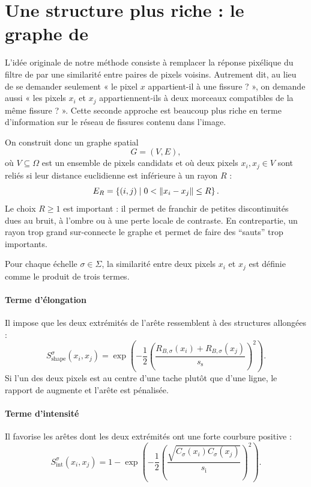\section{Une structure plus riche : le graphe de \Frangi}
\label{sec:chapIII_graphe_frangi}

L'idée originale de notre méthode consiste à remplacer la réponse pixélique du filtre de \Frangi{} par une similarité entre paires de pixels voisins. 
Autrement dit, au lieu de se demander seulement « le pixel $x$ appartient-il à une fissure ? », on demande aussi « les pixels $x_i$ et $x_j$ appartiennent-ils à deux morceaux compatibles de la même fissure ? ».
Cette seconde approche est beaucoup plus riche en terme d'information sur le réseau de fissures contenu dans l'image.

On construit donc un graphe spatial
\[
    G=(V,E),
\]
où $V\subseteq \Omega$ est un ensemble de pixels candidats et où deux pixels $x_i,x_j\in V$ sont reliés si leur distance euclidienne est inférieure à un rayon $R$ :
\begin{equation}
    E_R
    =
    \left\{(i,j) \;\middle|\; 0 < \lVert x_i-x_j \rVert \le R \right\}.
    \label{eq:chapIII_edges_radius}
\end{equation}
Le choix $R\ge1$ est important : il permet de franchir de petites discontinuités dues au bruit, à l'ombre ou à une perte locale de contraste. En contrepartie, un rayon trop grand sur-connecte le graphe et permet de faire des ``sauts'' trop importants. 

Pour chaque échelle $\sigma\in\Sigma$, la similarité entre deux pixels $x_i$ et $x_j$ est définie comme le produit de trois termes.

\paragraph{Terme d'élongation}
Il impose que les deux extrémités de l'arête ressemblent à des structures allongées :
\begin{equation}
    S_{\mathrm{shape}}^\sigma(x_i,x_j)
    =
    \exp\left(
        -\frac12
        \left(
            \frac{R_{B,\sigma}(x_i)+R_{B,\sigma}(x_j)}{s_{\mathrm{s}}}
        \right)^2
    \right).
    \label{eq:chapIII_shape}
\end{equation}
Si l'un des deux pixels est au centre d'une tache plutôt que d'une ligne, le rapport de \Frangi{} augmente et l'arête est pénalisée.

\paragraph{Terme d'intensité}
Il favorise les arêtes dont les deux extrémités ont une forte courbure positive :
\begin{equation}
    S_{\mathrm{int}}^\sigma(x_i,x_j)
    =
    1-
    \exp\left(
        -\frac12
        \left(
            \frac{\sqrt{C_\sigma(x_i)C_\sigma(x_j)}}{s_{\mathrm{i}}}
        \right)^2
    \right).
    \label{eq:chapIII_int}
\end{equation}

